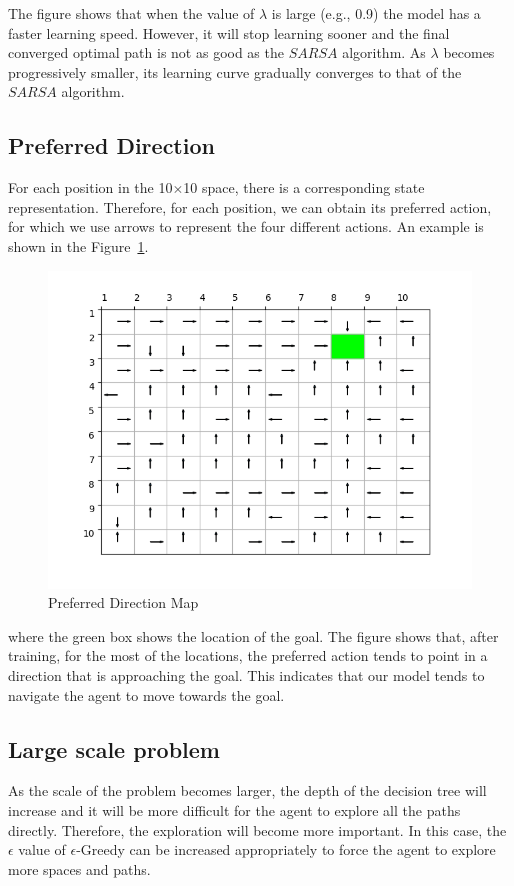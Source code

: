 \documentclass[conference]{IEEEtran}
\begin{document}
The figure shows that when the value of \({\lambda}\) is large (e.g., 0.9) the model has a faster learning speed. However, it will stop learning sooner and the final converged optimal path is not as good as the \(SARSA\) algorithm. As \({\lambda}\) becomes progressively smaller, its learning curve gradually converges to that of the \(SARSA\) algorithm.

\subsection{Preferred Direction}

For each position in the 10\({\times}\)10 space, there is a corresponding state representation. Therefore, for each position, we can obtain its preferred action, for which we use arrows to represent the four different actions. An example is shown in the Figure~\ref{fig:direc}.

\begin{figure}[!ht]
    \centering
    \includegraphics[width=.45\textwidth]{figures/preferred_direc/0.png}
    \caption{Preferred Direction Map}\label{fig:direc}
\end{figure}

where the green box shows the location of the goal. The figure shows that, after training, for the most of the locations, the preferred action tends to point in a direction that is approaching the goal. This indicates that our model tends to navigate the agent to move towards the goal.

\subsection{Large scale problem}

As the scale of the problem becomes larger, the depth of the decision tree will increase and it will be more difficult for the agent to explore all the paths directly. Therefore, the exploration will become more important. In this case, the \({\epsilon}\) value of \({\epsilon}\)-Greedy can be increased appropriately to force the agent to explore more spaces and paths. 
\end{document}
